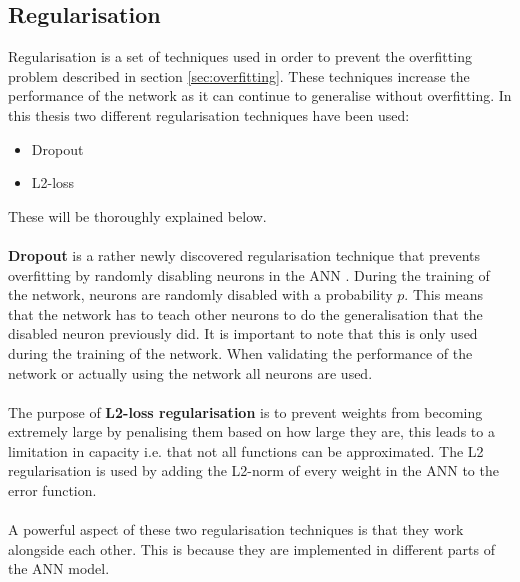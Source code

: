 \subsection{Regularisation}\label{sec:regularisation}
Regularisation is a set of techniques used in order to prevent the overfitting problem described in section \ref{sec:overfitting}. These techniques increase the performance of the network as it can continue to generalise without overfitting. 
In this thesis two different regularisation techniques have been used:
\begin{itemize}
    \item Dropout
    \item L2-loss
\end{itemize}
These will be thoroughly explained below.
\\\\
\textbf{Dropout} is a rather newly discovered regularisation technique that prevents overfitting by randomly disabling neurons in the ANN \parencite{srivastava2014dropout}. During the training of the network, neurons are randomly disabled with a probability $p$. This means that the network has to teach other neurons to do the generalisation that the disabled neuron previously did. It is important to note that this is only used during the training of the network. When validating the performance of the network or actually using the network all neurons are used.
\\\\
The purpose of \textbf{L2-loss regularisation} is to prevent weights from becoming extremely large by penalising them based on how large they are, this leads to a limitation in capacity i.e. that not all functions can be approximated. The L2 regularisation is used by adding the L2-norm of every weight in the ANN to the error function.
\\\\

A powerful aspect of these two regularisation techniques is that they work alongside each other. This is because they are implemented in different parts of the ANN model.

